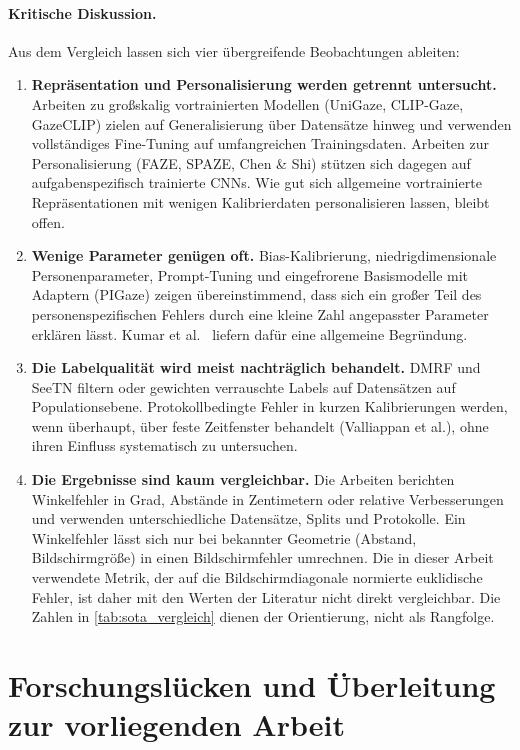 \documentclass[
  11pt,
  a4paper,
  oneside,
  DIV=12,                 %
  BCOR=8mm,               %
  parskip=half,           %
  headings=normal,
  bibliography=totoc,     %
  listof=totoc            %
]{scrreprt}
\begin{document}
\paragraph{Kritische Diskussion.}
Aus dem Vergleich lassen sich vier übergreifende Beobachtungen ableiten:
\begin{enumerate}
  \item \textbf{Repräsentation und Personalisierung werden getrennt untersucht.} Arbeiten zu großskalig vortrainierten Modellen (UniGaze, CLIP-Gaze, GazeCLIP) zielen auf Generalisierung über Datensätze hinweg und verwenden vollständiges Fine-Tuning auf umfangreichen Trainingsdaten. Arbeiten zur Personalisierung (FAZE, SPAZE, Chen \& Shi) stützen sich dagegen auf aufgabenspezifisch trainierte CNNs. Wie gut sich allgemeine vortrainierte Repräsentationen mit wenigen Kalibrierdaten personalisieren lassen, bleibt offen.
  \item \textbf{Wenige Parameter genügen oft.} Bias-Kalibrierung, niedrigdimensionale Personenparameter, Prompt-Tuning und eingefrorene Basismodelle mit Adaptern (PIGaze) zeigen übereinstimmend, dass sich ein großer Teil des personenspezifischen Fehlers durch eine kleine Zahl angepasster Parameter erklären lässt. Kumar et al.~\cite{kumar2022finetuning} liefern dafür eine allgemeine Begründung.
  \item \textbf{Die Labelqualität wird meist nachträglich behandelt.} DMRF und SeeTN filtern oder gewichten verrauschte Labels auf Datensätzen auf Populationsebene. Protokollbedingte Fehler in kurzen Kalibrierungen werden, wenn überhaupt, über feste Zeitfenster behandelt (Valliappan et al.), ohne ihren Einfluss systematisch zu untersuchen.
  \item \textbf{Die Ergebnisse sind kaum vergleichbar.} Die Arbeiten berichten Winkelfehler in Grad, Abstände in Zentimetern oder relative Verbesserungen und verwenden unterschiedliche Datensätze, Splits und Protokolle. Ein Winkelfehler lässt sich nur bei bekannter Geometrie (Abstand, Bildschirmgröße) in einen Bildschirmfehler umrechnen. Die in dieser Arbeit verwendete Metrik, der auf die Bildschirmdiagonale normierte euklidische Fehler, ist daher mit den Werten der Literatur nicht direkt vergleichbar. Die Zahlen in \cref{tab:sota_vergleich} dienen der Orientierung, nicht als Rangfolge.
\end{enumerate}

\section{Forschungslücken und Überleitung zur vorliegenden Arbeit}
\label{sec:luecken}
\end{document}
